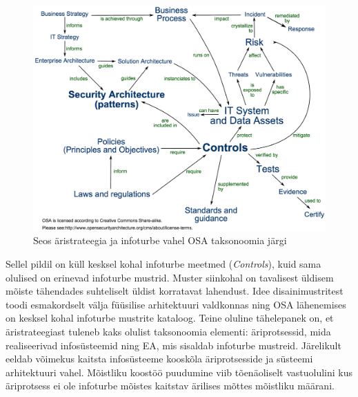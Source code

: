 \documentclass{tufte-book}
\begin{document}
\begin{figure}[h]
	\includegraphics[width=\linewidth]{osa.png}%
	\caption{Seos äristrateegia ja infoturbe vahel OSA taksonoomia järgi} 
	\label{fig:osa}
\end{figure}

Sellel pildil on küll kesksel kohal infoturbe meetmed (\emph{Controls}), kuid sama olulised on erinevad infoturbe mustrid. Muster siinkohal on tavalisest üldisem mõiste tähendades suhteliselt üldist korratavat lahendust. Idee disainimustritest toodi esmakordselt välja füüsilise arhitektuuri valdkonnas ning OSA lähenemises on kesksel kohal infoturbe mustrite kataloog. Teine oluline tähelepanek on, et äristrateegiast tuleneb kaks olulist taksonoomia elementi: äriprotsessid, mida realiseerivad infosüsteemid ning EA, mis sisaldab infoturbe mustreid. Järelikult eeldab võimekus kaitsta infosüsteeme kooskõla äriprotsesside ja süsteemi arhitektuuri vahel. Mõistliku koostöö puudumine viib tõenäoliselt vastuolulini kus äriprotsess ei ole infoturbe mõistes kaitstav ärilises mõttes mõistliku määrani.
\end{document}
